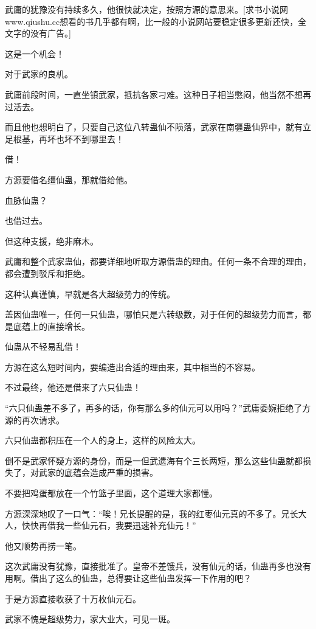 
\begin{this_body}

武庸的犹豫没有持续多久，他很快就决定，按照方源的意思来。[求书小说网www.qiushu.cc想看的书几乎都有啊，比一般的小说网站要稳定很多更新还快，全文字的没有广告。]

这是一个机会！

对于武家的良机。

武庸前段时间，一直坐镇武家，抵抗各家刁难。这种日子相当憋闷，他当然不想再过活去。

而且他也想明白了，只要自己这位八转蛊仙不陨落，武家在南疆蛊仙界中，就有立足根基，再坏也坏不到哪里去！

借！

方源要借名缰仙蛊，那就借给他。

血脉仙蛊？

也借过去。

但这种支援，绝非麻木。

武庸和整个武家蛊仙，都要详细地听取方源借蛊的理由。任何一条不合理的理由，都会遭到驳斥和拒绝。

这种认真谨慎，早就是各大超级势力的传统。

盖因仙蛊唯一，任何一只仙蛊，哪怕只是六转级数，对于任何的超级势力而言，都是底蕴上的直接增长。

仙蛊从不轻易乱借！

方源在这么短时间内，要编造出合适的理由来，其中相当的不容易。

不过最终，他还是借来了六只仙蛊！

“六只仙蛊差不多了，再多的话，你有那么多的仙元可以用吗？”武庸委婉拒绝了方源的再次请求。

六只仙蛊都积压在一个人的身上，这样的风险太大。

倒不是武家怀疑方源的身份，而是一但武遗海有个三长两短，那么这些仙蛊就都损失了，对武家的底蕴会造成严重的损害。

不要把鸡蛋都放在一个竹篮子里面，这个道理大家都懂。

方源深深地叹了一口气：“唉！兄长提醒的是，我的红枣仙元真的不多了。兄长大人，快快再借我一些仙元石，我要迅速补充仙元！”

他又顺势再捞一笔。

这次武庸没有犹豫，直接批准了。皇帝不差饿兵，没有仙元的话，仙蛊再多也没有用啊。借出了这么的仙蛊，总得要让这些仙蛊发挥一下作用的吧？

于是方源直接收获了十万枚仙元石。

武家不愧是超级势力，家大业大，可见一斑。


\end{this_body}
